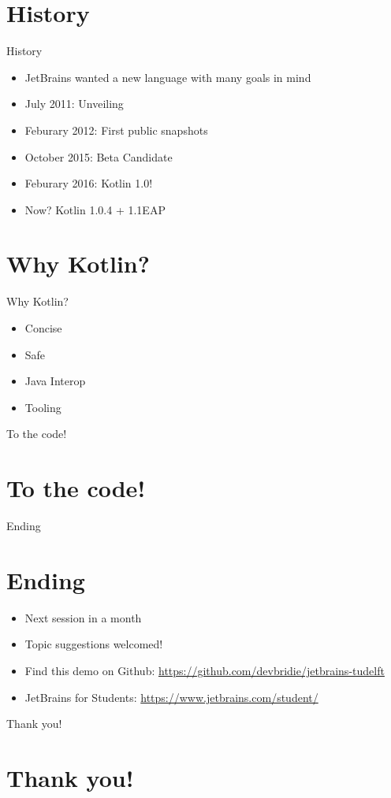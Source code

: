 \documentclass{beamer}
\begin{document}
\section{History}

\begin{frame}{History}
\begin{itemize}
    \item JetBrains wanted a new language with many goals in mind
    \pause
    \item July 2011: Unveiling
    \item Feburary 2012: First public snapshots
    \item October 2015: Beta Candidate
    \item Feburary 2016: Kotlin 1.0!
    \item Now? \pause Kotlin 1.0.4 + 1.1EAP
\end{itemize}
\end{frame}

\section{Why Kotlin?}

\begin{frame}{Why Kotlin?}
\begin{itemize}
    \item Concise \pause
    \item Safe \pause
    \item Java Interop \pause
    \item Tooling
\end{itemize}
\end{frame}


\begin{frame}{To the code!}
\section{To the code!}
\end{frame}

\begin{frame}{Ending}
\section{Ending}
\begin{itemize}
    \item Next session in a month
    \item Topic suggestions welcomed!
    \item Find this demo on Github: \url{https://github.com/devbridie/jetbrains-tudelft}
    \item JetBrains for Students: \url{https://www.jetbrains.com/student/}
\end{itemize}
\end{frame}

\begin{frame}{Thank you!}
\section{Thank you!}
\end{frame}
\end{document}
